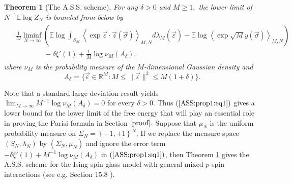 \documentclass[12pt]{article}
\newcommand{\veps}{\vec{\varepsilon}}
\newcommand{\vsi}{{\vec{\sigma}}}
\newcommand{\vz}{\vec{z}}
\newtheorem{theorem}{\bf Theorem}
\newenvironment{Proof of lemma}{\noindent{\bf Proof of Lemma}}{\hfill$\Box$\newline}
\newenvironment{Proof of theorem}{\noindent{\bf Proof of Theorem}}{\hfill{\footnotesize${\square}$}\newline}
\newenvironment{Proof of theorems}{\noindent{\bf Proof of Theorems}}{\hfill$\Box$\newline}
\newenvironment{Proof of proposition}{\noindent{\bf Proof of Proposition}}{\hfill$\Box$\newline}
\newenvironment{Proof of propositions}{\noindent{\bf Proof of Propositions}}{\hfill$\Box$\newline}
\newenvironment{Proof of exercise}{\noindent{\it Proof of Exercise:}}{\hfill$\Box$}
\numberwithin{equation}{section}
\begin{document}
\begin{theorem}[The A.S.S. scheme]
\label{ASS:prop1}
For any $\delta>0$ and $M\geq 1,$ the lower limit of $N^{-1}\mathbb{E}\log Z_N$ is bounded from below by
\begin{align}
\begin{split}\label{ASS:prop1:eq1}
&\frac{1}{M}\liminf_{N\rightarrow\infty}\left(\mathbb{E}\log \int_{S_M}\left<\exp \veps\cdot \vz (\vsi)\right>_{M,N}d\lambda_M(\veps)-
\mathbb{E}\log \left<\exp \sqrt{M}y(\vsi)\right>_{M,N}\right)\\
&\qquad\qquad -\delta\xi'(1)+\frac{1}{M}\log \nu_M(A_\delta),
\end{split}
\end{align}
where $\nu_M$ is the probability measure of the $M$-dimensional Gaussian density and 
$$
A_\delta=\{\veps\in\mathbb{R}^M:M\leq\|\veps\|^2\leq M(1+\delta)\}.
$$
\end{theorem}

\smallskip

\noindent 
Note that a standard large deviation result yields $\lim_{M\rightarrow \infty}M^{-1}\log\nu_M(A_\delta)=0$ for every $\delta>0.$ Thus $(\ref{ASS:prop1:eq1})$ gives a lower bound for the lower limit of the free energy that will play an essential role in proving the Parisi formula in Section $\ref{proof}.$ Suppose that $\mu_N$ is the uniform probability measure on $\Sigma_N=\left\{-1,+1\right\}^N$. If we replace the measure space $(S_N,\lambda_N)$ by $(\Sigma_N,\mu_N)$ and ignore the error term $-\delta\xi'(1)+M^{-1}\log \nu_M(A_\delta)$ in $(\ref{ASS:prop1:eq1})$, then Theorem \ref{ASS:prop1} gives the A.S.S. scheme for the Ising spin glass model with general mixed $p$-spin interactions (see e.g. Section 15.8 \cite{Tal11}). 
\end{document}
